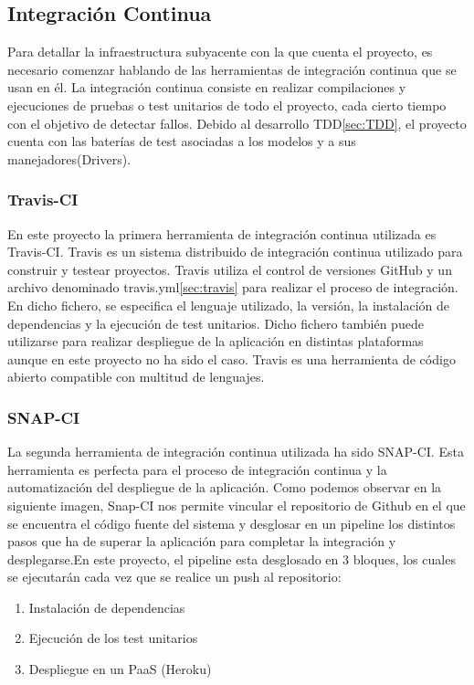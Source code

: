 \documentclass[a4paper,11pt]{book}
\begin{document}
\subsection{Integración Continua}

Para detallar la infraestructura subyacente con la que cuenta el proyecto, es necesario comenzar hablando de las herramientas de integración continua que se usan en él. La integración continua consiste en realizar compilaciones y ejecuciones de pruebas o test unitarios de todo el proyecto, cada cierto tiempo con el objetivo de detectar fallos. Debido al desarrollo TDD\ref{sec:TDD}, el proyecto cuenta con las baterías de test asociadas a los modelos y a sus manejadores(Drivers).

\subsubsection{Travis-CI}
En este proyecto la primera herramienta de integración continua utilizada es Travis-CI\cite{travis}. Travis es un  sistema distribuido de integración continua utilizado para construir y testear proyectos. Travis utiliza el control de versiones GitHub y un archivo denominado travis.yml\ref{sec:travis} para realizar el proceso de integración. En dicho fichero, se especifica el lenguaje utilizado, la versión, la instalación de dependencias y la ejecución de test unitarios. Dicho fichero también puede utilizarse para realizar despliegue de la aplicación en distintas plataformas aunque en este proyecto no ha sido el caso. Travis es una herramienta de código abierto compatible con multitud de lenguajes. 

\subsubsection{SNAP-CI}
La segunda herramienta de integración continua utilizada ha sido SNAP-CI\cite{snap}. Esta herramienta es perfecta para el proceso de integración continua y la automatización del despliegue de la aplicación. Como podemos observar en la siguiente imagen, Snap-CI nos permite vincular el repositorio de Github en el que se encuentra el código fuente del sistema y desglosar en un pipeline los distintos pasos que ha de superar la aplicación para completar la integración y desplegarse.En este proyecto, el pipeline esta desglosado en 3 bloques, los cuales se ejecutarán cada vez que se realice un push al repositorio:

\begin{enumerate}
\item Instalación de dependencias
\item Ejecución de los test unitarios
\item Despliegue en un PaaS (Heroku)  
\end{enumerate}
\end{document}
